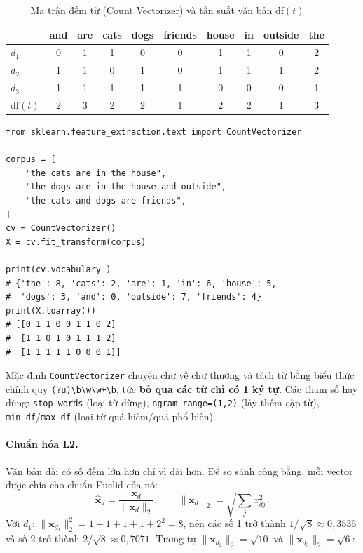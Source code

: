 \begin{table}[H]
\centering
\begin{tabular}{|l|c|c|c|c|c|c|c|c|c|}
\hline
 & and & are & cats & dogs & friends & house & in & outside & the \\
\hline
$d_1$ & 0 & 1 & 1 & 0 & 0 & 1 & 1 & 0 & 2 \\ \hline
$d_2$ & 1 & 1 & 0 & 1 & 0 & 1 & 1 & 1 & 2 \\ \hline
$d_3$ & 1 & 1 & 1 & 1 & 1 & 0 & 0 & 0 & 1 \\ \hline
$\mathrm{df}(t)$ & 2 & 3 & 2 & 2 & 1 & 2 & 2 & 1 & 3 \\ \hline
\end{tabular}
\caption{Ma trận đếm từ (Count Vectorizer) và tần suất văn bản $\mathrm{df}(t)$}
\label{tab:count}
\end{table}

\begin{lstlisting}[caption={Count Vectorizer với scikit-learn}]
from sklearn.feature_extraction.text import CountVectorizer

corpus = [
    "the cats are in the house",
    "the dogs are in the house and outside",
    "the cats and dogs are friends",
]
cv = CountVectorizer()
X = cv.fit_transform(corpus)

print(cv.vocabulary_)
# {'the': 8, 'cats': 2, 'are': 1, 'in': 6, 'house': 5,
#  'dogs': 3, 'and': 0, 'outside': 7, 'friends': 4}
print(X.toarray())
# [[0 1 1 0 0 1 1 0 2]
#  [1 1 0 1 0 1 1 1 2]
#  [1 1 1 1 1 0 0 0 1]]
\end{lstlisting}

Mặc định \texttt{CountVectorizer} chuyển chữ về chữ thường và tách từ bằng biểu thức chính quy \verb|(?u)\b\w\w+\b|, tức \textbf{bỏ qua các từ chỉ có 1 ký tự}. Các tham số hay dùng: \texttt{stop\_words} (loại từ dừng), \texttt{ngram\_range=(1,2)} (lấy thêm cặp từ), \texttt{min\_df}/\texttt{max\_df} (loại từ quá hiếm/quá phổ biến).

\paragraph{Chuẩn hóa L2.} Văn bản dài có số đếm lớn hơn chỉ vì dài hơn. Để so sánh công bằng, mỗi vector được chia cho chuẩn Euclid của nó:
\begin{equation}
    \hat{\mathbf{x}}_d = \frac{\mathbf{x}_d}{\|\mathbf{x}_d\|_2}, \qquad \|\mathbf{x}_d\|_2 = \sqrt{\textstyle\sum_{j} x_{dj}^2}.
\end{equation}
Với $d_1$: $\|\mathbf{x}_{d_1}\|_2^2 = 1+1+1+1+2^2 = 8$, nên các số 1 trở thành $1/\sqrt{8} \approx 0{,}3536$ và số 2 trở thành $2/\sqrt{8} \approx 0{,}7071$. Tương tự $\|\mathbf{x}_{d_2}\|_2 = \sqrt{10}$ và $\|\mathbf{x}_{d_3}\|_2 = \sqrt{6}$:

